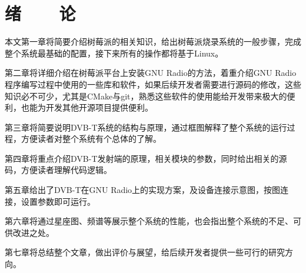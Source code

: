 \renewcommand{\baselinestretch}{1.5}
\fontsize{12pt}{13pt}\selectfont
{}
\chapter*{绪~~~~论}

\par 本文第一章将简要介绍树莓派的相关知识，给出树莓派烧录系统的一般步骤，完成整个系统最基础的配置，接下来所有的操作都将基于Linux。
\par 第二章将详细介绍在树莓派平台上安装GNU Radio的方法，着重介绍GNU Radio程序编写过程中使用的一些库和软件，如果后续开发者需要进行源码的修改，这些知识必不可少，尤其是CMake与git，熟悉这些软件的使用能给开发带来极大的便利，也能为开发其他开源项目提供便利。
\par 第三章将简要说明DVB-T系统的结构与原理，通过框图解释了整个系统的运行过程，方便读者对整个系统有个总体的了解。
\par 第四章将重点介绍DVB-T发射端的原理，相关模块的参数，同时给出相关的源码，方便读者理解代码逻辑。
\par 第五章给出了DVB-T在GNU Radio上的实现方案，及设备连接示意图，按图连接，设置参数即可运行。
\par 第六章将通过星座图、频谱等展示整个系统的性能，也会指出整个系统的不足、可供改进之处。
\par 第七章将总结整个文章，做出评价与展望，给后续开发者提供一些可行的研究方向。

\clearpage